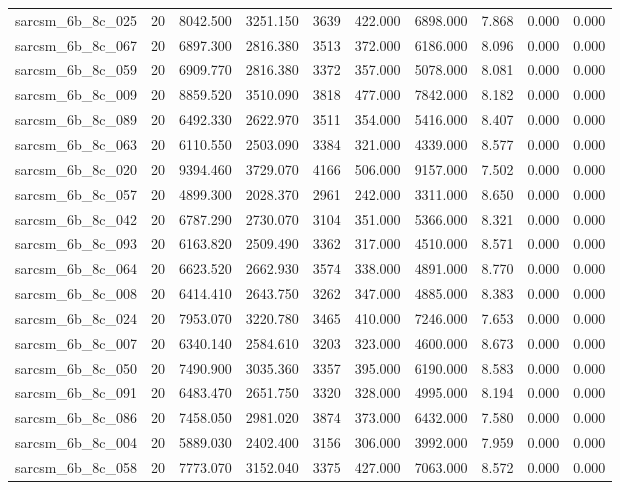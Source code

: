 \begin{tabular}{lrrrrrrrrr}
sarcsm\_6b\_8c\_025 & 20 & 8042.500 & 3251.150 & 3639 & 422.000 & 6898.000 & 7.868 & 0.000 & 0.000 \\
sarcsm\_6b\_8c\_067 & 20 & 6897.300 & 2816.380 & 3513 & 372.000 & 6186.000 & 8.096 & 0.000 & 0.000 \\
sarcsm\_6b\_8c\_059 & 20 & 6909.770 & 2816.380 & 3372 & 357.000 & 5078.000 & 8.081 & 0.000 & 0.000 \\
sarcsm\_6b\_8c\_009 & 20 & 8859.520 & 3510.090 & 3818 & 477.000 & 7842.000 & 8.182 & 0.000 & 0.000 \\
sarcsm\_6b\_8c\_089 & 20 & 6492.330 & 2622.970 & 3511 & 354.000 & 5416.000 & 8.407 & 0.000 & 0.000 \\
sarcsm\_6b\_8c\_063 & 20 & 6110.550 & 2503.090 & 3384 & 321.000 & 4339.000 & 8.577 & 0.000 & 0.000 \\
sarcsm\_6b\_8c\_020 & 20 & 9394.460 & 3729.070 & 4166 & 506.000 & 9157.000 & 7.502 & 0.000 & 0.000 \\
sarcsm\_6b\_8c\_057 & 20 & 4899.300 & 2028.370 & 2961 & 242.000 & 3311.000 & 8.650 & 0.000 & 0.000 \\
sarcsm\_6b\_8c\_042 & 20 & 6787.290 & 2730.070 & 3104 & 351.000 & 5366.000 & 8.321 & 0.000 & 0.000 \\
sarcsm\_6b\_8c\_093 & 20 & 6163.820 & 2509.490 & 3362 & 317.000 & 4510.000 & 8.571 & 0.000 & 0.000 \\
sarcsm\_6b\_8c\_064 & 20 & 6623.520 & 2662.930 & 3574 & 338.000 & 4891.000 & 8.770 & 0.000 & 0.000 \\
sarcsm\_6b\_8c\_008 & 20 & 6414.410 & 2643.750 & 3262 & 347.000 & 4885.000 & 8.383 & 0.000 & 0.000 \\
sarcsm\_6b\_8c\_024 & 20 & 7953.070 & 3220.780 & 3465 & 410.000 & 7246.000 & 7.653 & 0.000 & 0.000 \\
sarcsm\_6b\_8c\_007 & 20 & 6340.140 & 2584.610 & 3203 & 323.000 & 4600.000 & 8.673 & 0.000 & 0.000 \\
sarcsm\_6b\_8c\_050 & 20 & 7490.900 & 3035.360 & 3357 & 395.000 & 6190.000 & 8.583 & 0.000 & 0.000 \\
sarcsm\_6b\_8c\_091 & 20 & 6483.470 & 2651.750 & 3320 & 328.000 & 4995.000 & 8.194 & 0.000 & 0.000 \\
sarcsm\_6b\_8c\_086 & 20 & 7458.050 & 2981.020 & 3874 & 373.000 & 6432.000 & 7.580 & 0.000 & 0.000 \\
sarcsm\_6b\_8c\_004 & 20 & 5889.030 & 2402.400 & 3156 & 306.000 & 3992.000 & 7.959 & 0.000 & 0.000 \\
sarcsm\_6b\_8c\_058 & 20 & 7773.070 & 3152.040 & 3375 & 427.000 & 7063.000 & 8.572 & 0.000 & 0.000 \\

\end{tabular}
